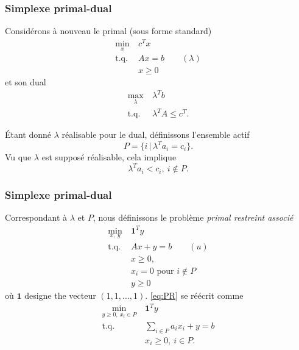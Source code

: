 \documentclass[t,usepdftitle=false]{beamer}
\def\bone{\boldsymbol{1}}
\begin{document}
\begin{frame}
\frametitle{Simplexe primal-dual}

Considérons à nouveau le primal (sous forme standard)
\begin{equation}
\tag{P}
\begin{aligned}
\min_x \ & c^Tx \\
\mbox{t.q. } & Ax = b \qquad (\lambda) \\
& x \geq 0
\end{aligned}
\label{eq:P}
\end{equation}
et son dual
\begin{equation}
\tag{D}
\begin{aligned}
\max_{\lambda} \ & \lambda^T b \\
\mbox{t.q. } & \lambda^T A \leq c^T.
\end{aligned}
\label{eq:D}
\end{equation}

\mbox{}

Étant donné $\lambda$ réalisable pour le dual, définissons l'ensemble actif
\[
P = \lbrace i \,|\, \lambda^T a_i = c_i \rbrace.
\]
Vu que $\lambda$ est supposé réalisable, cela implique
\[
\lambda^T a_i < c_i,\ i \notin P.
\]

\end{frame}

\begin{frame}
\frametitle{Simplexe primal-dual}

Correspondant à $\lambda$ et $P$, nous définissons le problème {\sl primal restreint associé}
\begin{equation}
\tag{PR}
\label{eq:PR}
\begin{aligned}
\min_{x,\ y} \ & \bone^Ty \\
\mbox{t.q. } & Ax + y = b  \qquad (u)\\
& x \geq 0,\\
& x_i = 0 \mbox{ pour } i \notin P\\
& y \geq 0
\end{aligned}
\end{equation}
où $\bone$ designe the vecteur $(1, 1, \ldots, 1)$.
\eqref{eq:PR} se réécrit comme
$$
\begin{aligned}
\min_{y \geq 0,\ x_i \in P} \ & \bone^Ty \\
\mbox{t.q. } & \sum_{i \in P} a_ix_i + y = b \\
& x_i \geq 0,\  i \in P.
\end{aligned}
$$

\end{frame}
\end{document}
